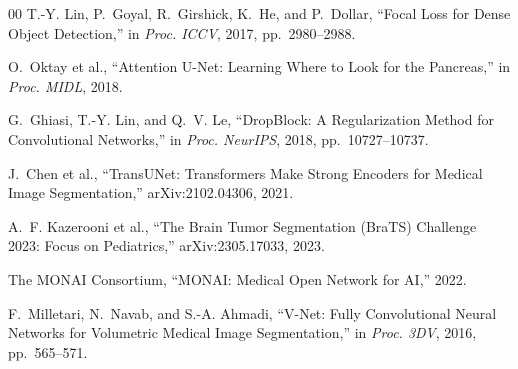 \documentclass[conference]{IEEEtran}
\begin{document}
\begin{thebibliography}{00}
 T.-Y. Lin, P.~Goyal, R.~Girshick, K.~He,
and P.~Dollar,
``Focal Loss for Dense Object Detection,''
in \textit{Proc. ICCV}, 2017, pp.~2980--2988.

 O.~Oktay et al.,
``Attention U-Net: Learning Where to Look for the Pancreas,''
in \textit{Proc. MIDL}, 2018.

 G.~Ghiasi, T.-Y. Lin, and Q.~V. Le,
``DropBlock: A Regularization Method for Convolutional
Networks,''
in \textit{Proc. NeurIPS}, 2018, pp.~10727--10737.

 J.~Chen et al.,
``TransUNet: Transformers Make Strong Encoders for
Medical Image Segmentation,''
arXiv:2102.04306, 2021.

 A.~F. Kazerooni et al.,
``The Brain Tumor Segmentation (BraTS) Challenge 2023:
Focus on Pediatrics,''
arXiv:2305.17033, 2023.

 The MONAI Consortium,
``MONAI: Medical Open Network for AI,'' 2022.

 F.~Milletari, N.~Navab, and S.-A. Ahmadi,
``V-Net: Fully Convolutional Neural Networks for Volumetric
Medical Image Segmentation,''
in \textit{Proc. 3DV}, 2016, pp.~565--571.

\end{thebibliography}
\end{document}
